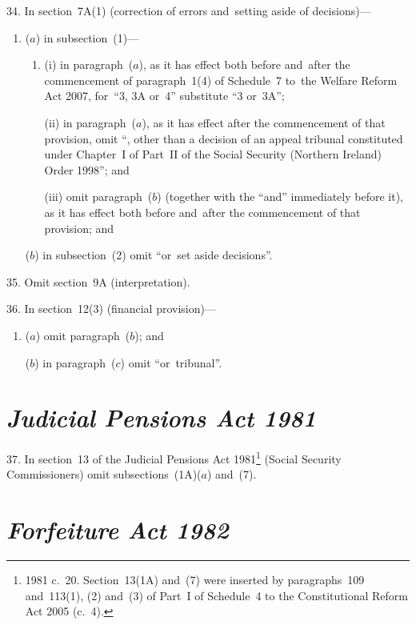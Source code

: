 \documentclass[12pt,a4paper]{article}
\begin{document}
34.  In section~7A(1) (correction of errors and~setting aside of decisions)—
\begin{enumerate}\item[]
($a$) in subsection~(1)—
\begin{enumerate}\item[]
(i) in paragraph~($a$), as it has effect both before and~after the commencement of paragraph~1(4) of Schedule~7 to~the Welfare Reform Act 2007, for~“3, 3A or~4” substitute “3 or~3A”;

(ii) in paragraph~($a$), as it has effect after the commencement of that provision, omit “, other than a decision of an appeal tribunal constituted under Chapter~I of Part~II of the Social Security (Northern Ireland) Order 1998”; and

(iii) omit paragraph~($b$)  (together with the “and” immediately before it), as it has effect both before and~after the commencement of that provision; and
\end{enumerate}

($b$) in subsection~(2) omit “or~set aside decisions”.
\end{enumerate}

\medskip

35.  Omit section~9A (interpretation).

\medskip

36.  In section~12(3) (financial provision)—
\begin{enumerate}\item[]
($a$) omit paragraph~($b$); and

($b$) in paragraph~($c$)  omit “or~tribunal”.
\end{enumerate}

\section*{\itshape Judicial Pensions Act 1981}

37.  In section~13 of the Judicial Pensions Act 1981\footnote{1981 c.~20. Section~13(1A) and~(7) were inserted by paragraphs~109 and~113(1), (2) and~(3) of Part~I of Schedule~4 to the Constitutional Reform Act 2005 (c.~4).} (Social Security Commissioners) omit subsections~(1A)($a$)  and~(7).

\section*{\itshape Forfeiture Act 1982}
\end{document}
